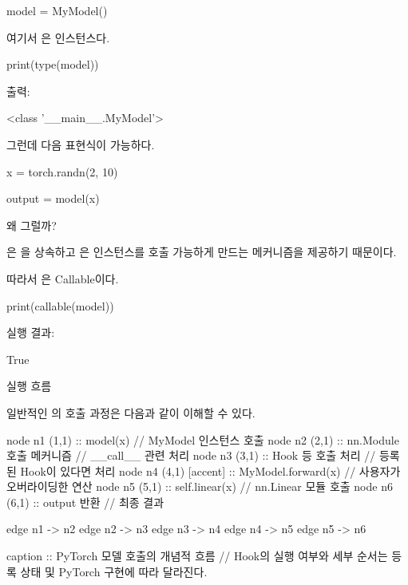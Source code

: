 \begin{dhkcode}
model = MyModel()
\end{dhkcode}

여기서 은  인스턴스다.

\begin{dhkcode}
print(type(model))
\end{dhkcode}

출력:

\begin{dhkzsh}
<class '__main__.MyModel'>
\end{dhkzsh}

그런데 다음 표현식이 가능하다.

\begin{dhkcode}
x = torch.randn(2, 10)

output = model(x)
\end{dhkcode}

왜 그럴까?

은 을 상속하고 은 인스턴스를 호출 가능하게 만드는  메커니즘을 제공하기 때문이다.

따라서 은 Callable이다.

\begin{dhkcode}
print(callable(model))
\end{dhkcode}

실행 결과:

\begin{dhkzsh}
True
\end{dhkzsh}

\begin{dhknote}
\begin{dhksmry}[centered]
실행 흐름 
\end{dhksmry}
\end{dhknote}

일반적인 의 호출 과정은 다음과 같이 이해할 수 있다.

\begin{dhkgraph}[uniform]
node n1 (1,1) :: model(x) // MyModel 인스턴스 호출
node n2 (2,1) :: nn.Module 호출 메커니즘 // __call__ 관련 처리
node n3 (3,1) :: Hook 등 호출 처리 // 등록된 Hook이 있다면 처리
node n4 (4,1) [accent] :: MyModel.forward(x) // 사용자가 오버라이딩한 연산
node n5 (5,1) :: self.linear(x) // nn.Linear 모듈 호출
node n6 (6,1) :: output 반환 // 최종 결과

edge n1 -> n2
edge n2 -> n3
edge n3 -> n4
edge n4 -> n5
edge n5 -> n6

caption :: PyTorch 모델 호출의 개념적 흐름 // Hook의 실행 여부와 세부 순서는 등록 상태 및 PyTorch 구현에 따라 달라진다.
\end{dhkgraph}

